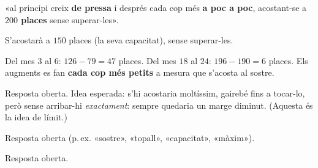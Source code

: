 \begin{solucions}
\begin{sollist}
  \item «al principi creix \textbf{de pressa} i després cada cop més \textbf{a poc a
        poc}, acostant-se a \textbf{$200$ places} sense superar-les».
  \item S'acostarà a $150$ places (la seva capacitat), sense superar-les.
  \item Del mes $3$ al $6$: $126-79=47$ places. Del mes $18$ al $24$: $196-190=6$
        places. Els augments es fan \textbf{cada cop més petits} a mesura que s'acosta
        al sostre.
  \item Resposta oberta. Idea esperada: s'hi acostaria moltíssim, gairebé fins a
        tocar-lo, però sense arribar-hi \emph{exactament}: sempre quedaria un marge
        diminut. (Aquesta és la idea de límit.)
  \item Resposta oberta (p.\,ex. «sostre», «topall», «capacitat», «màxim»).
  \item Resposta oberta.
\end{sollist}
\end{solucions}
